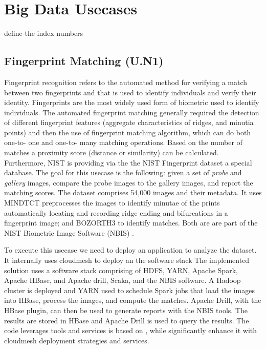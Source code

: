 \section{Big Data Usecases}


define the index numbers

\subsection{Fingerprint Matching (U.N1)}

Fingerprint recognition refers to the automated method for verifying a
match between two fingerprints and that is used to identify
individuals and verify their identity. Fingerprints are the most
widely used form of biometric used to identify individuals. The
automated fingerprint matching generally required the detection of
different fingerprint features (aggregate characteristics of ridges,
and minutia points) and then the use of fingerprint matching
algorithm, which can do both one-to- one and one-to- many matching
operations. Based on the number of matches a proximity score (distance
or similarity) can be calculated. Furthermore, NIST is providing via
the the NIST Fingerprint dataset a special database. The goal for this
usecase is the following: given a set of {\it probe} and {\it gallery}
images, compare the probe images to the gallery images, and report the
matching scores.  The dataset comprises 54,000 images and their
metadata.  It uses MINDTCT \cite{Hyungro:??} preprocesses the images
to identify minutae of the prints automatically locating and recording
ridge ending and bifurcations in a fingerprint image; and BOZORTH3
\cite{Hyungro:??} to identify matches. Both are are part of the NIST
Biometric Image Software (NBIS) \cite{Hyungro:??}.

To execute this usecase we need to deploy an application to analyze
the dataset. It internally uses cloudmesh to deploy an the software
stack The implemented \cite{??} 
solution uses a software stack comprising of HDFS, YARN, Apache Spark,
Apache HBase, and Apache drill, Scaka, and the NBIS software. A Hadoop
cluster is deployed and YARN used to schedule Spark jobs that load the
images into HBase, process the images, and compute the matches. Apache
Drill, with the HBase plugin, can then be used to generate reports
with the NBIS tools\cite{??}. The results are stored in HBase and
Apache Drill \cite{??} is used to query the results.  The code
leverages tools and services is based on \cite{??}   , while significantly
enhance it with cloudmesh deployment strategies and services.

